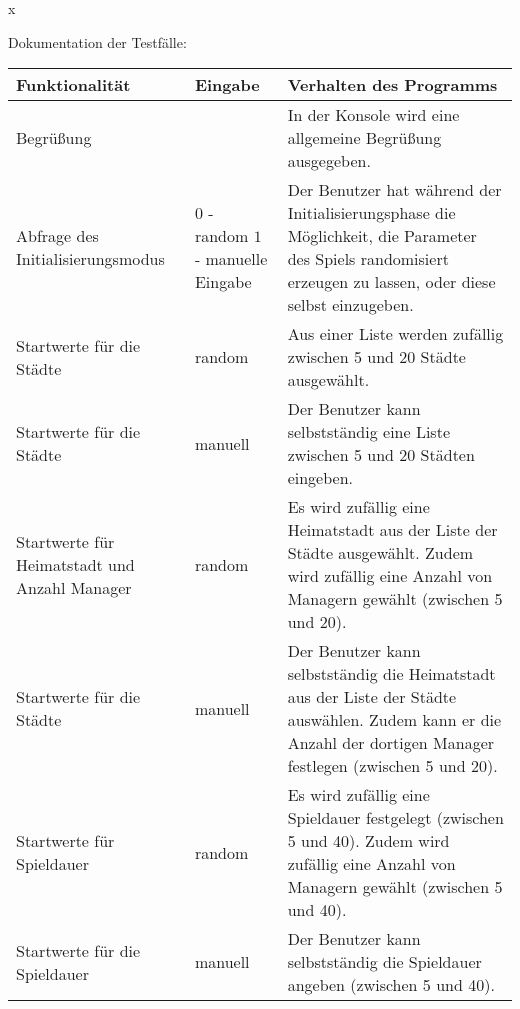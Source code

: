 \documentclass[a4paper]{article}
\begin{document}
\begin{exercise}{x}

Dokumentation der Testf\"alle:


\begin{center}
	\begin{tabular}{| p{2.5cm} | p{2.2cm} | p{10cm} |}
		\hline
		Funktionalit\"at & Eingabe & Verhalten des Programms\\ \hline \hline
		
		Begr\"u\ss{}ung & 
		& In der Konsole wird eine allgemeine Begr\"u\ss{}ung ausgegeben. \\ \hline
		
		Abfrage des Initialisierungsmodus & $0$ - random \newline $1$ - manuelle Eingabe
		& Der Benutzer hat w\"ahrend der Initialisierungsphase die M\"oglichkeit, die
		Parameter des Spiels randomisiert erzeugen zu lassen, oder diese selbst einzugeben.\\ \hline
		
		Startwerte f\"ur die St\"adte & random
		& Aus einer Liste werden zuf\"allig zwischen 5 und 20 St\"adte ausgew\"ahlt. \\ \hline
		
		Startwerte f\"ur die St\"adte & manuell
		& Der Benutzer kann selbstst\"andig eine Liste zwischen 5 und 20 St\"adten eingeben. \\ \hline
		
		Startwerte f\"ur Heimatstadt und Anzahl Manager & random
		& Es wird zuf\"allig eine Heimatstadt aus der Liste der St\"adte ausgew\"ahlt.
		Zudem wird zuf\"allig eine Anzahl von Managern gew\"ahlt (zwischen 5 und 20). \\ \hline
		
		Startwerte f\"ur die St\"adte & manuell
		& Der Benutzer kann selbstst\"andig die Heimatstadt aus der Liste der St\"adte ausw\"ahlen.
		Zudem kann er die Anzahl der dortigen Manager festlegen (zwischen 5 und 20). \\ \hline
		
		Startwerte f\"ur Spieldauer & random
		& Es wird zuf\"allig eine Spieldauer festgelegt (zwischen 5 und 40).
		Zudem wird zuf\"allig eine Anzahl von Managern gew\"ahlt (zwischen 5 und 40). \\ \hline
		
		Startwerte f\"ur die Spieldauer & manuell
		& Der Benutzer kann selbstst\"andig die Spieldauer angeben (zwischen 5 und 40). \\ \hline
		

\end{tabular}
\end{center}
\end{exercise}
\end{document}

